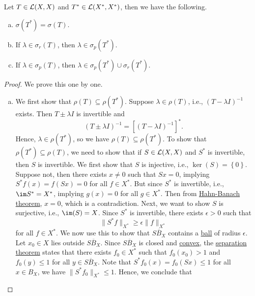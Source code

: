 \begin{theorem}\label{thm:lec21}
	Let \(T\in \mathcal{\MakeUppercase{l}} (X, X)\) and \(T^{\ast} \in \mathcal{\MakeUppercase{l}} (X^{\ast} , X^{\ast} )\), then we have the following.
	\begin{enumerate}[(a)]
		\item \(\sigma (T^{\ast} ) = \sigma (T)\).
		\item If \(\lambda \in \sigma _r(T)\), then \(\lambda \in \sigma _p(T^{\ast} )\).
		\item If \(\lambda \in \sigma _p(T)\), then \(\lambda \in \sigma _p(T^{\ast} ) \cup \sigma _r(T^{\ast} )\).
	\end{enumerate}
\end{theorem}
\begin{proof}\let\qed\relax
	We prove this one by one.
	\begin{enumerate}[(a)]
		\item We first show that \(\rho (T) \subseteq \rho (T^{\ast})\). Suppose \(\lambda \in \rho (T)\), i.e., \((T-\lambda I)^{-1} \) exists. Then \(T\pm \lambda I\) is invertible and
		      \[
			      (T\pm \lambda I)^{-1} = \left[ (T-\lambda I)^{-1}  \right] ^{\ast}.
		      \]
		      Hence, \(\lambda \in \rho (T^{\ast} )\), so we have \(\rho (T) \subseteq \rho (T^{\ast})\). To show that \(\rho (T^{\ast}) \subseteq \rho (T)\), we need to show that if \(S\in \mathcal{\MakeUppercase{l}} (X, X)\) and \(S^{\ast} \) is invertible, then \(S\) is invertible. We first show that \(S\) is injective, i.e., \(\ker(S)= \left\{ 0 \right\} \). Suppose not, then there exists \(x \neq 0\) such that \(Sx = 0\), implying \(S^{\ast} f(x) = f(Sx) = 0\) for all \(f\in X^{\ast} \). But since \(S^{\ast} \) is invertible, i.e., \(\im S^{\ast} = X^{\ast} \), implying \(g(x) = 0\) for all \(g\in X^{\ast} \). Then from \hyperref[thm:Hahn-Banach]{Hahn-Banach theorem}, \(x = 0\), which is a contradiction. Next, we want to show \(S\) is surjective, i.e., \(\im(S) = X\). Since \(S^{\ast} \) is invertible, there exists \(\epsilon >0\) such that
		      \[
			      \lVert S^{\ast} f \rVert _{X^{\ast} }\geq \epsilon \lVert f \rVert _{X^{\ast}}
		      \]
		      for all \(f\in X^{\ast} \). We now use this to show that \(\overline{SB_X}\) contains a \hyperref[def:ball]{ball} of radius \(\epsilon \). Let \(x_0\in X\) lies outside \(\overline{SB_X}\). Since \(\overline{SB_X}\) is closed and \hyperref[def:convex-set]{convex}, the \hyperref[thm:separation-of-a-point-from-a-convex-set]{separation theorem} states that there exists \(f_0\in X^{\ast} \) such that \(f_0(x_0)>1\) and \(f_0(y) \leq 1\) for all \(y\in \overline{SB_X}\). Note that \(S^{\ast} f_0(x) = f_0(Sx) \leq 1\) for all \(x\in B_X\), we have \(\lVert S^{\ast} f_0 \rVert_{X^{\ast} }\leq 1 \). Hence, we conclude that

\end{enumerate}
\end{proof}
